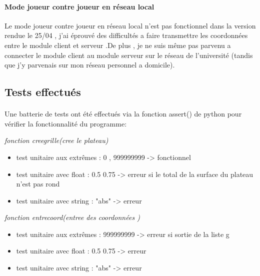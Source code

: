 \documentclass[a4paper,12pt]{article}
\begin{document}
\paragraph{Mode joueur contre joueur en réseau local}
Le mode joueur contre joueur en réseau local n'est pas fonctionnel dans la version rendue le 25/04 , j'ai éprouvé des difficultés a faire transmettre les coordonnées entre le module client et serveur .De plus , je ne suis même pas parvenu a connecter le module client  au module serveur sur le réseau de l'université (tandis que j'y parvenais sur mon réseau personnel a domicile). 


\newpage
\begin{center}
\section{Tests effectués}
\end{center}
\vspace{2cm}
\paragraph{}
Une batterie de tests ont été effectués via la fonction assert() de python pour vérifier la fonctionnalité du programme:
\newline

\emph{fonction creegrille(cree le plateau)}
\begin{itemize}
\item test unitaire aux extrêmes : 0 , 999999999 -> fonctionnel
\item test unitaire avec float   : 0.5 0.75  -> erreur si le total de la surface du plateau n'est pas rond
\item test unitaire avec string  : "abs"  -> erreur
\newline
\end{itemize}

\emph{fonction entrecoord(entree des coordonnées )}
\begin{itemize}
\item test unitaire aux extrêmes :  999999999 -> erreur si sortie de la liste g
\item test unitaire avec float   : 0.5 0.75  -> erreur 
\item test unitaire avec string  : "abs"  -> erreur
\end{itemize}
\end{document}
